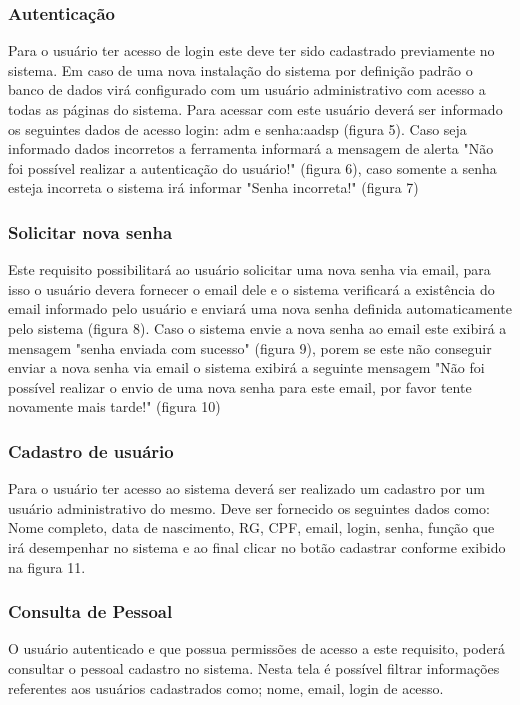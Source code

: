 \documentclass{acm_proc_article-sp}
\begin{document}
\subsubsection{Autenticação}
Para o usuário ter acesso de login este deve ter sido cadastrado previamente no sistema. Em caso de uma nova instalação do sistema por definição padrão o banco de dados virá configurado com um usuário administrativo com  acesso a todas as páginas do sistema. Para acessar com este usuário deverá ser informado os seguintes dados de acesso login: adm e senha:aadsp (figura 5). Caso seja informado dados incorretos a ferramenta informará a mensagem de alerta "Não foi possível realizar a autenticação do usuário!" (figura 6), caso somente a senha esteja incorreta o sistema irá informar "Senha incorreta!" (figura 7)

\subsubsection{Solicitar nova senha}
Este requisito possibilitará ao usuário solicitar uma nova senha via email, para isso o usuário devera fornecer o email dele e o sistema verificará a existência do email informado pelo usuário e enviará uma nova senha definida automaticamente pelo sistema (figura 8). Caso o sistema envie a nova senha ao email este exibirá a mensagem "senha enviada com sucesso" (figura 9), porem se este não conseguir enviar a nova senha via email o sistema exibirá a seguinte mensagem "Não foi possível realizar o envio de uma nova senha para este email, por favor tente novamente mais tarde!" (figura 10)

\subsubsection{Cadastro de usuário}
Para o usuário ter acesso ao sistema deverá ser realizado um cadastro por um usuário administrativo do mesmo. Deve ser fornecido os seguintes dados como: Nome completo, data de nascimento, RG, CPF, email, login, senha, função que irá desempenhar no sistema e ao final clicar no botão cadastrar conforme exibido na figura 11.

\subsubsection{Consulta de Pessoal}
O usuário autenticado e que possua permissões de acesso a este requisito, poderá consultar o pessoal cadastro no sistema. Nesta tela é possível filtrar informações referentes aos usuários cadastrados como; nome, email, login de acesso.   
\end{document}
